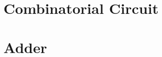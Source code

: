 \documentclass[a4paper,oneside,11pt,ngerman,english]{scrartcl}
\begin{document}
\maketitle


\tableofcontents




\section{Combinatorial Circuit}\label{section:combinatorial-circuit}


\newpage


\section{Adder}\label{section:adder}


\newpage


\end{document}
